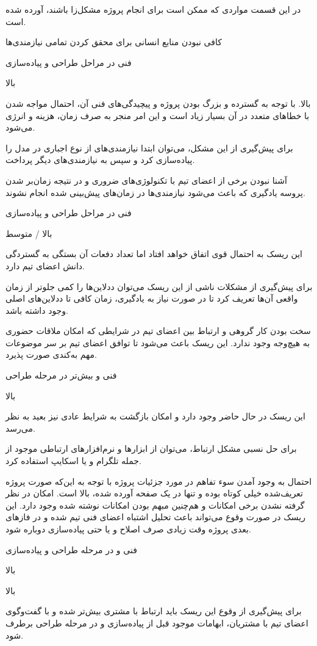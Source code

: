 
 در این قسمت مواردی که ممکن است برای انجام پروژه مشکل‌زا باشند، آورده شده است.

 کافی نبودن منابع انسانی برای محقق کردن تمامی نیازمندی‌ها

 فنی در مراحل طراحی و پیاده‌سازی


 بالا

 بالا. با توجه به گسترده و بزرگ بودن پروژه و پیچیدگی‌های فنی آن، احتمال مواجه شدن با خطاهای متعدد در آن بسیار زیاد است و این امر منجر به صرف زمان، هزینه و انرژی می‌شود.

 برای پیش‌گیری از این مشکل، می‌توان ابتدا نیازمندی‌های از نوع اجباری در مدل  را پیاده‌سازی کرد و سپس به نیازمندی‌های دیگر پرداخت.

\newpage

 آشنا نبودن برخی از اعضای تیم با تکنولوژی‌های ضروری و در نتیجه زمان‌بر شدن پروسه یادگیری که باعث می‌شود نیازمندی‌ها در زمان‌های پیش‌بینی شده انجام نشوند.

 فنی در مراحل طراحی و پیاده‌سازی

 بالا / متوسط

 این ریسک به احتمال قوی اتفاق خواهد افتاد اما تعداد دفعات آن بستگی به گستردگی دانش اعضای تیم دارد.

 برای پیش‌گیری از مشکلات ناشی از این ریسک می‌توان ددلاین‌ها را کمی جلوتر از زمان واقعی آن‌ها تعریف کرد تا در صورت نیاز به یادگیری، زمان کافی تا ددلاین‌های اصلی وجود داشته باشد.

\newpage

 سخت بودن کار گروهی و ارتباط بین اعضای تیم در شرایطی که امکان ملاقات حضوری به هیچ‌وجه وجود ندارد. این ریسک باعث می‌شود تا توافق اعضای تیم بر سر موضوعات مهم به‌کندی صورت پذیرد.

 فنی و بیش‌تر در مرحله طراحی

 بالا

 این ریسک در حال حاضر وجود دارد و امکان بازگشت به شرایط عادی نیز بعید به نظر می‌رسد.

 برای حل نسبی مشکل ارتباط، می‌توان از ابزارها و نرم‌افزارهای ارتباطی موجود از جمله تلگرام و یا اسکایپ استفاده کرد.

\newpage


 احتمال به وجود آمدن سوء تفاهم در مورد جزئیات پروژه با توجه به این‌که صورت پروژه تعریف‌شده خیلی کوتاه بوده و تنها در یک صفحه آورده شده، بالا است. امکان در نظر گرفته نشدن برخی امکانات و هم‌چنین مبهم بودن امکانات نوشته شده وجود دارد. این ریسک در صورت وقوع می‌تواند باعث تحلیل اشتباه اعضای فنی تیم شده و در فازهای بعدی پروژه وقت زیادی صرف اصلاح و یا حتی پیاده‌سازی دوباره شود.

 فنی و در مرحله طراحی و پیاده‌سازی

 بالا

 بالا

  برای پیش‌گیری از وقوع این ریسک باید ارتباط با مشتری بیش‌تر شده و با گفت‌وگوی اعضای تیم با مشتریان، ابهامات موجود قبل از پیاده‌سازی و در مرحله طراحی برطرف شود.
